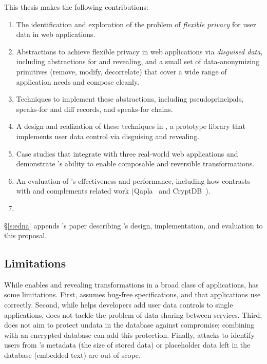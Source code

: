 \label{sec:intro:contrib}
%
This thesis makes the following contributions: 
\begin{enumerate}[nosep]
    \item The identification and exploration of the problem of \emph{flexible
        privacy} for user data in web applications. 

    \item Abstractions to achieve flexible privacy in web applications via \emph{disguised data},
        including abstractions for \xxing and revealing, and a small set of
        data-anonymizing primitives (remove, modify, decorrelate) that cover a
        wide range of application needs and compose cleanly.

    \item Techniques to implement these abstractions, including
    pseudoprincipals, speaks-for and diff
    records, and speaks-for chains.

    \item A design and realization of these techniques in \sys, a prototype
        library that implements user data control via disguising and revealing.

    \item Case studies that integrate \sys with three real-world web
    applications and demonstrate \sys's ability to enable composable and
    reversible transformations.

    \item An evaluation of \sys's effectiveness and performance, including how
    \sys contrasts with and complements related work (Qapla~\cite{qapla} and
    CryptDB~\cite{cryptdb}).  
    
\item {}
\end{enumerate}
%
\S\ref{s:edna} appends \sys's paper describing \sys's design, implementation,
and evaluation to this proposal.

\subsection{Limitations}
%
While \sys enables \xxing and revealing transformations in a broad class of
applications, \sys has some limitations.
%
First, \sys assumes bug-free \xx specifications, and that applications use \sys
correctly.
%
Second, while \sys helps developers add user data controls to single applications,
\sys does not tackle the problem of data sharing between services.
%
Third, \sys does not aim to protect un\xxed data in the database against compromise;
combining \sys with an encrypted database can add this protection.
%
Finally, attacks to identify users from \sys's metadata (\eg the size of
stored \xxed data) or placeholder data left in the database (\eg embedded text)
are out of scope.
%

